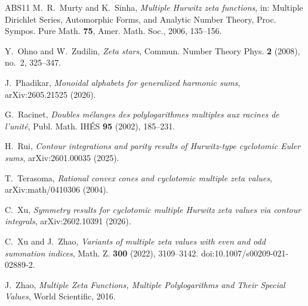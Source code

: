 \documentclass[11pt]{amsart}
\theoremstyle{definition}
\theoremstyle{remark}
\numberwithin{equation}{section}
\begin{document}
\begin{thebibliography}{ABS11}
 M.~R.~Murty and K.~Sinha, \emph{Multiple Hurwitz zeta functions}, in: Multiple Dirichlet Series, Automorphic Forms, and Analytic Number Theory, Proc. Sympos. Pure Math. \textbf{75}, Amer. Math. Soc., 2006, 135--156.

 Y.~Ohno and W.~Zudilin, \emph{Zeta stars}, Commun. Number Theory Phys. \textbf{2} (2008), no.~2, 325--347.

 J.~Phadikar, \emph{Monoidal alphabets for generalized harmonic sums}, arXiv:2605.21525 (2026).

 G.~Racinet, \emph{Doubles m\'elanges des polylogarithmes multiples aux racines de l'unit\'e}, Publ. Math. IH\'ES \textbf{95} (2002), 185--231.

 H.~Rui, \emph{Contour integrations and parity results of Hurwitz-type cyclotomic Euler sums}, arXiv:2601.00035 (2025).

 T.~Terasoma, \emph{Rational convex cones and cyclotomic multiple zeta values}, arXiv:math/0410306 (2004).

 C.~Xu, \emph{Symmetry results for cyclotomic multiple Hurwitz zeta values via contour integrals}, arXiv:2602.10391 (2026).

 C.~Xu and J.~Zhao, \emph{Variants of multiple zeta values with even and odd summation indices}, Math. Z. \textbf{300} (2022), 3109--3142. doi:10.1007/s00209-021-02889-2.

 J.~Zhao, \emph{Multiple Zeta Functions, Multiple Polylogarithms and Their Special Values}, World Scientific, 2016.

\end{thebibliography}
\end{document}
